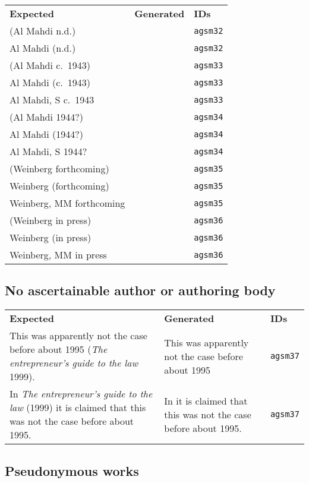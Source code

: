 \documentclass[a4paper,landscape,12pt]{article}
\newlength\q
\newlength\qr
\newenvironment{citetable}
  {\noindent\begin{longtable}{p{\q} p{\q} p{\qr}}\textbf{Expected} & \textbf{Generated} & \textbf{IDs}\\}
  {\end{longtable}}
\newcommand{\majorissue}[1]{\textcolor{red}{#1}}
\begin{document}
\begin{citetable}
	(Al Mahdi n.d.) & \parencite{agsm32} & \texttt{agsm32} \\
	Al Mahdi (n.d.) & \textcite{agsm32} & \texttt{agsm32} \\
	(Al Mahdi c.~1943) & \parencite{agsm33} & \texttt{agsm33} \\
	Al Mahdi (c.~1943) & \textcite{agsm33} & \texttt{agsm33} \\
	Al Mahdi, S c.~1943 & \fullcite{agsm33} & \texttt{agsm33} \\
	(Al Mahdi 1944?) & \parencite{agsm34} & \texttt{agsm34} \\
	Al Mahdi (1944?) & \textcite{agsm34} & \texttt{agsm34} \\
	Al Mahdi, S 1944? & \fullcite{agsm34} & \texttt{agsm34} \\
	(Weinberg forthcoming) & \majorissue{\parencite{agsm35}} & \texttt{agsm35} \\
	Weinberg (forthcoming) & \majorissue{\textcite{agsm35}} & \texttt{agsm35} \\
	Weinberg, MM forthcoming & \majorissue{\fullcite{agsm35}} & \texttt{agsm35} \\
	(Weinberg in press) & \majorissue{\parencite{agsm36}} & \texttt{agsm36} \\
	Weinberg (in press) & \majorissue{\textcite{agsm36}} & \texttt{agsm36} \\
	Weinberg, MM in press & \majorissue{\fullcite{agsm36}} & \texttt{agsm36} \\
\end{citetable}

\subsection{No ascertainable author or authoring body}

\begin{citetable}
	This was apparently not the case before about 1995 (\textit{The entrepreneur's guide to the law} 1999). & This was apparently not the case before about 1995 \parencite{agsm37} & \texttt{agsm37} \\
	In \textit{The entrepreneur's guide to the law} (1999) it is claimed that this was not the case before about 1995. & In \textcite{agsm37} it is claimed that this was not the case before about 1995. & \texttt{agsm37} \\
\end{citetable}

\subsection{Pseudonymous works}
\end{document}
